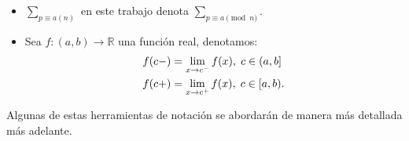 \begin{itemize}[label=$\bullet$]
\item $\displaystyle\sum_{p\equiv a (n)}$ en este trabajo denota $\displaystyle\sum_{p\equiv a \pmod{n}}$.

\item Sea $f:(a,b) \longrightarrow \mathbb{R}$ una función real, denotamos:
   \begin{align*}
       f(c-)&=\lim_{x \rightarrow c^-} f(x), \hspace{0.1cm} c \in (a,b] \notag \\
       f(c+)&=\lim_{x \rightarrow c^+} f(x), \hspace{0.1cm} c \in [a,b).
   \end{align*}
\end{itemize}

\begin{note}
Algunas de estas herramientas de notación se abordarán de manera más detallada más adelante.
\end{note}

\begin{comment}
En el capítulo 1 presentaremos algunos preliminares que se pueden consultar en el contenido y estudiaremos un poco la función $\zeta(s)$ y su derivada logarítmica $\dfrac{\zeta^{\prime}(s)}{\zeta(s)}$, veremos que el TNP es equivalente a la afirmación $\psi(x)\thicksim x$, función que también estudiaremos allí. El capítulo 2 será para presentar una prueba del teorema de Dirichlet, las ideas subyacentes y los preliminares de la  prueba también se desarrollarán allí, en los capítulos 3 y 4 se desarrollarán las pruebas del TNP y el TNP sobre progresiones aritmética, estudiaremos la teoría Tauberiana, que nos permitirá dar una prueba sencilla del TNP y donde casi toda  la variable compleja estará escondida en el teorema de Wiener-Ikehara que también presentaremos allí junto con algunas aplicaciones.
\end{comment}